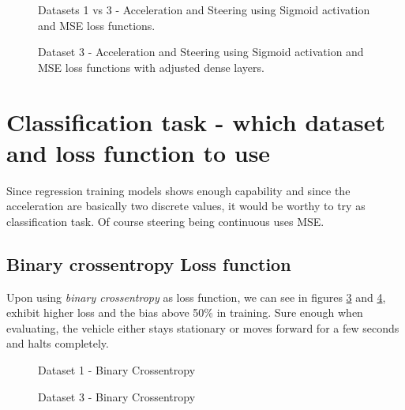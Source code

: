 \begin{figure}[h]
	\centering
    \def\svgwidth{\textwidth}
    
    \caption{Datasets 1 vs 3 - Acceleration and Steering using Sigmoid activation and MSE loss
    functions.}
    \label{fig:ds1andd3SigactivatonMSE}
\end{figure}
\begin{figure}[h]
	\centering
    \def\svgwidth{\textwidth}
    
    \caption{Dataset 3 - Acceleration and Steering using Sigmoid activation and MSE loss
    functions with adjusted dense layers.}
    \label{fig:ds3SigactivatonMSE}
\end{figure}

\section{Classification task - which dataset and loss function to use}
Since regression training models shows enough capability and since the acceleration are
basically two discrete values, it would be worthy to try as classification task. Of
course steering being continuous uses MSE.
\subsection{Binary crossentropy Loss function}
Upon using \textit{binary crossentropy} as loss function, we can see in figures
\ref{fig:ds1binarycrossentropy} and \ref{fig:ds3binarycrossentropy}, exhibit higher loss
and the bias above 50\% in training. Sure enough when evaluating, the vehicle either stays
stationary or moves forward for a few seconds and halts completely.
\begin{figure}[h]
	\centering
    \def\svgwidth{0.8\textwidth}
    \caption{Dataset 1 - Binary Crossentropy}
    \label{fig:ds1binarycrossentropy}
\end{figure}

\begin{figure}[h]
	\centering
    \def\svgwidth{0.8\textwidth}
    \caption{Dataset 3 - Binary Crossentropy}
    \label{fig:ds3binarycrossentropy}
\end{figure}

